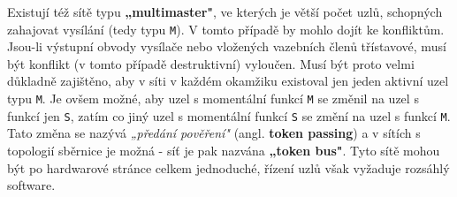         Existují též sítě typu \textbf{„multimaster"}, ve kterých je větší počet uzlů, schopných 
        zahajovat vysílání (tedy typu \texttt{M}). V tomto případě by mohlo dojít ke konfliktům. 
        Jsou-li výstupní obvody vysílače nebo vložených vazebních členů třístavové, musí být 
        konflikt (v tomto případě destruktivní) vyloučen. Musí být proto velmi důkladně zajištěno, 
        aby v síti v každém okamžiku  existoval jen jeden aktivní uzel typu \texttt{M}. Je ovšem 
        možné, aby uzel s momentální funkcí \texttt{M} se změnil na uzel s funkcí jen \texttt{S}, 
        zatím co jiný uzel s momentální funkcí \texttt{S} se změní na uzel s funkcí \texttt{M}. 
        Tato změna se nazývá \emph{„předání pověření"} (angl. \textbf{token passing}) a v sítích s 
        topologií sběrnice je možná - síť je pak nazvána \textbf{„token bus"}. Tyto sítě 
        mohou být po hardwarové stránce celkem jednoduché, řízení uzlů však vyžaduje rozsáhlý 
        software.
        
